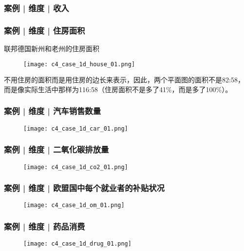 \begin{frame}
  \frametitle{案例 | 维度 | 收入}
  \begin{figure}
    \centering
  \end{figure}
\end{frame}

\begin{frame}
  \frametitle{案例 | 维度 | 住房面积}
  \begin{block}{联邦德国新州和老州的住房面积}
    \begin{figure}
      \centering
      \texttt{[image: c4\_case\_1d\_house\_01.png]}
    \end{figure}
    \vspace{-0.5em}
    不用住房的面积而是用住房的边长来表示，因此，两个平面图的面积不是82:58，而是像实际生活中那样为116:58（住房面积不是多了41\%，而是多了100\%）。
  \end{block}
\end{frame}

\begin{frame}
  \frametitle{案例 | 维度 | 汽车销售数量}
  \begin{figure}
    \centering
    \texttt{[image: c4\_case\_1d\_car\_01.png]}
  \end{figure}
\end{frame}

\begin{frame}
  \frametitle{案例 | 维度 | 二氧化碳排放量}
  \begin{figure}
    \centering
    \texttt{[image: c4\_case\_1d\_co2\_01.png]}
  \end{figure}
\end{frame}

\begin{frame}
  \frametitle{案例 | 维度 | 欧盟国中每个就业者的补贴状况}
  \begin{figure}
    \centering
    \texttt{[image: c4\_case\_1d\_om\_01.png]}
  \end{figure}
\end{frame}

\begin{frame}
  \frametitle{案例 | 维度 | 药品消费}
  \begin{figure}
    \centering
    \texttt{[image: c4\_case\_1d\_drug\_01.png]}
  \end{figure}
\end{frame}

